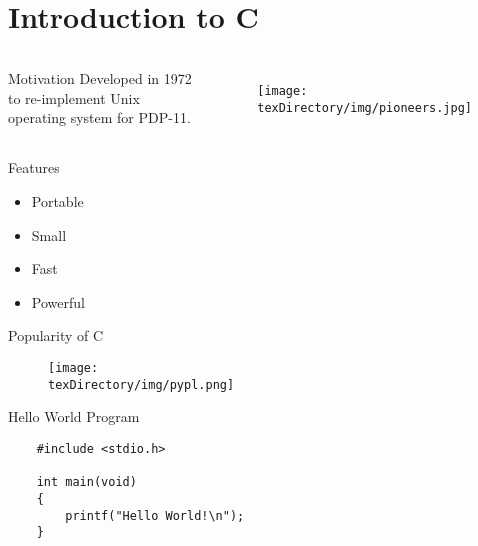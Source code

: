\documentclass[compress]{beamer}
\begin{document}
\prepareCover

\section{Introduction to C}

\begin{slide}
	\begin{columns}
	\begin{block}{Motivation}
	Developed in 1972 to re-implement Unix operating system for PDP-11.
	\end{block}
	\begin{figure}
	\texttt{[image: \\texDirectory/img/pioneers.jpg]}
	\end{figure}
	\end{columns}
\end{slide}

\begin{slide}
	\begin{block}{Features}

	\begin{itemize}
	\item[] Portable
	\item[] Small
	\item[] Fast
	\item[] Powerful
	\end{itemize}

	\end{block}
\end{slide}

\begin{slide}
	\begin{block}{Popularity of C}

	\begin{figure}
	\texttt{[image: \\texDirectory/img/pypl.png]}
	\end{figure}

	\end{block}
\end{slide}

\begin{slide}
	\begin{block}{Hello World Program}

	\begin{verbatim}
	#include <stdio.h>

	int main(void)
	{
	    printf("Hello World!\n");
	}
	\end{verbatim}

	\end{block}
\end{slide}
\end{document}
